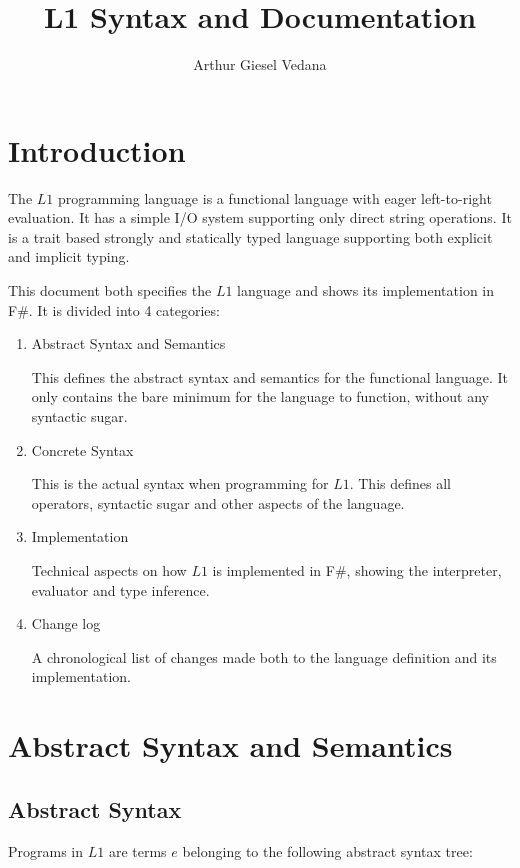 \documentclass{article}
\author{Arthur Giesel Vedana}
\title{L1 Syntax and Documentation}
\begin{document}
\maketitle
{}
\newpage

\tableofcontents
\newpage

\section*{Introduction}
The $L1$ programming language is a functional language with eager left-to-right evaluation.
It has a simple I/O system supporting only direct string operations. 
It is a trait based strongly and statically typed language supporting both explicit and implicit typing.


This document both specifies the $L1$ language and shows its implementation in F\#.
It is divided into 4 categories:
\begin{enumerate}
	\item Abstract Syntax and Semantics
	
		This defines the abstract syntax and semantics for the functional language.
		It only contains the bare minimum for the language to function, without any syntactic sugar. 
	\item Concrete Syntax
	
		This is the actual syntax when programming for $L1$.
		This defines all operators, syntactic sugar and other aspects of the language.
	\item Implementation
	
		Technical aspects on how $L1$ is implemented in F\#, showing the interpreter, evaluator and type inference.
	\item Change log
	
		A chronological list of changes made both to the language definition and its implementation.
\end{enumerate}

\newpage
{}
\section{Abstract Syntax and Semantics}

\subsection{Abstract Syntax}

Programs in $L1$ are terms $e$ belonging to the following abstract syntax tree:
\end{document}
